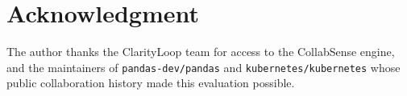 \documentclass[conference]{IEEEconf}
\begin{document}
\section*{Acknowledgment}
The author thanks the ClarityLoop team for access to the CollabSense engine, and the maintainers of \texttt{pandas-dev/pandas} and \texttt{kubernetes/kubernetes} whose public collaboration history made this evaluation possible.




\balance
\end{document}

